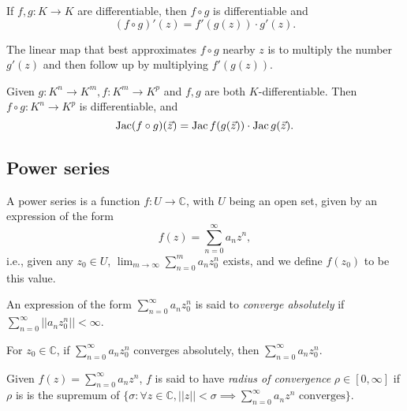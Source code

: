 
\begin{lem}
	If $f, g: K \to K$ are differentiable, then $f \circ g$ is differentiable and \[
		(f \circ g)'(z) = f'(g(z)) \cdot g'(z).
	\]
\end{lem}

The linear map that best approximates $f \circ g$ nearby $z$ is to multiply the number $g'(z)$ and then follow up by multiplying $f'(g(z))$.

\begin{lem}
	Given $g: K^n \to K^m, f: K^m \to K^p$ and $f, g$ are both $K$-differentiable. Then $f \circ g: K^n \to K^p$ is differentiable, and \[
		\operatorname{Jac} (f \circ g)(\vec z) = \operatorname{Jac} f (g(\vec z)) \cdot \operatorname{Jac} g(\vec z).
	\]
\end{lem}

\subsection{Power series}

\begin{defn}
	A power series is a function $f: U \to \mathbb{C}$, with $U$ being an open set, given by an expression of the form \[
		f(z) = \sum_{n=0}^\infty a_nz^n,
	\] i.e., given any $z_0 \in U$,  $\lim_{m\to \infty} \sum_{n = 0}^m a_nz_0^n$ exists, and we define $f(z_0)$ to be this value.
\end{defn}

\begin{defn}
	An expression of the form $\sum_{n=0}^\infty a_nz_0^n$ is said to \emph{converge absolutely} if $\sum_{n=0}^\infty ||a_nz_0^n|| < \infty$.
\end{defn}

\begin{prop}
	For $z_0 \in \mathbb{C}$, if $\sum_{n=0}^\infty{a_nz_0^n}$ converges absolutely, then $\sum_{n=0}^\infty a_nz_0^n$.
\end{prop}

\begin{defn}
	Given $f(z) = \sum_{n=0}^\infty a_nz^n$, $f$ is said to have \emph{radius of convergence} $\rho \in [0,\infty]$ if $\rho$ is is the supremum of $\{ \sigma : \forall z \in \mathbb{C}, ||z|| < \sigma \implies  \sum_{n=0}^\infty a_nz^n \text{ converges}\}$.
\end{defn}

